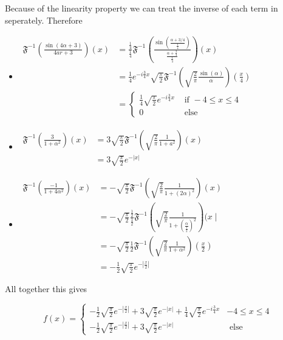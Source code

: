 \documentclass[11pt]{article}
\begin{document}
\begin{solution}   Because of the linearity property we can treat the inverse of each term in seperately. Therefore 
 \begin{itemize}
\item $\begin{aligned} \mathfrak{F}^{-1}\left(\frac{\sin (4 \alpha+3)}{4 a r+3}\right)(x) & =\frac{\frac{1}{4}}{\frac{1}{4}} \mathfrak{F}^{-1}\left(\frac{\sin \left(\frac{\alpha+3 / 4}{\frac{1}{4}}\right)}{\frac{\alpha+\frac{3}{4}}{\frac{1}{4}}}\right)(x) \\ & =\frac{1}{4} e^{-i \frac{3}{4} x} \sqrt{\frac{\pi}{2}} \mathfrak{F}^{-1}\left(\sqrt{\frac{2}{\pi}} \frac{\sin (\alpha)}{\alpha}\right)\left(\frac{x}{4}\right) \\ & = \begin{cases}\frac{1}{4} \sqrt{\frac{\pi}{2}} e^{-i \frac{3}{4} x} & \text { if }-4 \leq x \leq 4 \\ 0 & \text { else }\end{cases} \end{aligned}$
\item $\begin{aligned} \mathfrak{F}^{-1}\left(\frac{3}{1+\alpha^2}\right)(x) & =3 \sqrt{\frac{\pi}{2}} \mathfrak{F}^{-1}\left(\sqrt{\frac{2}{\pi}} \frac{1}{1+a^2}\right)(x) \\ & =3 \sqrt{\frac{\pi}{2}} e^{-|x|}\end{aligned}$
\item $\begin{aligned} \mathfrak{F}^{-1}\left(\frac{-1}{1+4 \alpha^2}\right)(x) & =-\sqrt{\frac{\pi}{2}} \mathfrak{F}^{-1}\left(\sqrt{\frac{2}{\pi}} \frac{1}{1+(2 \alpha)^2}\right)(x) \\ & =-\sqrt{\frac{\pi}{2}} \frac{\frac{1}{2}}{\frac{1}{2}} \mathfrak{F}^{-1}\left(\sqrt{\frac{2}{\pi}} \frac{1}{1+\left(\frac{\alpha}{\frac{1}{2}}\right)^2}\right)(x \mid \\ & =-\sqrt{\frac{\pi}{2}} \frac{1}{2} \mathfrak{F}^{-1}\left(\sqrt{\frac{2}{\pi}} \frac{1}{1+\alpha^2}\right)\left(\frac{x}{2}\right) \\ & =-\frac{1}{2} \sqrt{\frac{\pi}{2}} e^{-\left|\frac{x}{2}\right|}\end{aligned}$
\end{itemize}

All together this gives

$$
f(x) = \begin{cases}-\frac{1}{2} \sqrt{\frac{\pi}{2}} e^{-\left|\frac{x}{2}\right|}+3 \sqrt{\frac{\pi}{2}} e^{-|x|}+\frac{1}{4} \sqrt{\frac{\pi}{2}} e^{-i \frac{3}{4} x} & -4 \leq x \leq 4 \\ -\frac{1}{2} \sqrt{\frac{\pi}{2}} e^{-\left|\frac{x}{2}\right|}+3 \sqrt{\frac{\pi}{2}} e^{-|x|} & \text { else }\end{cases}
$$
\end{solution}
\end{document}
